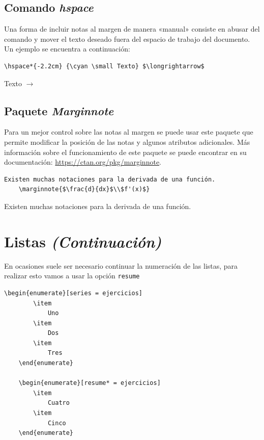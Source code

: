 \documentclass[a4,10pt]{aleph-notas}
\begin{document}
\subsection{Comando \emph{hspace}}

Una forma de incluir notas al margen de manera «manual» consiste en abusar del comando \verb@{} y mover el texto deseado fuera del espacio de trabajo del documento. Un ejemplo se encuentra a continuación:

\begin{lstlisting}[frame=single]
    \hspace*{-2.2cm} {\cyan \small Texto} $\longrightarrow$
\end{lstlisting}

\hspace*{-2.2cm} {\color{cyan} \small Texto $\longrightarrow$}

\subsection{Paquete \emph{Marginnote}}

Para un mejor control sobre las notas al margen se puede usar este paquete que permite modificar la posición de las notas y algunos atributos adicionales. Más información sobre el funcionamiento de este paquete se puede encontrar en su documentación: \href{https://ctan.org/pkg/marginnote}{https://ctan.org/pkg/marginnote}.

\begin{lstlisting}[frame=single]
    Existen muchas notaciones para la derivada de una función. 
    \marginnote{$\frac{d}{dx}$\\$f'(x)$}
\end{lstlisting}

Existen muchas notaciones para la derivada de una función. 

\section{Listas \textit{(Continuación)}}

En ocasiones suele ser necesario continuar la numeración de las listas, para realizar esto vamos a usar la opción \texttt{resume}

\begin{lstlisting}[frame=single]
    \begin{enumerate}[series = ejercicios]
        \item 
            Uno
        \item
            Dos
        \item
            Tres
    \end{enumerate}
    
    \begin{enumerate}[resume* = ejercicios]
        \item 
            Cuatro
        \item
            Cinco
    \end{enumerate}
\end{lstlisting}
\end{document}
